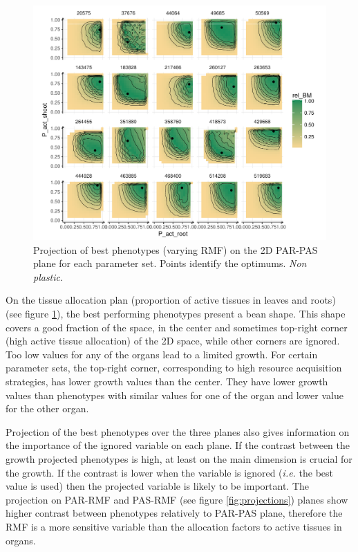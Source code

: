 \begin{figure}\label{fig:best_phenotypes}
\includegraphics[width = \textwidth]{./2_PP/Figures/Landscape/landscape_PAR-PAS.pdf}
\caption{Projection of best phenotypes (varying RMF) on the 2D PAR-PAS plane for each parameter set. Points identify the optimums. \textit{Non plastic}.}
\end{figure}

 On the tissue allocation plan (proportion of active tissues in leaves and roots) (see figure \ref{fig:best_phenotypes}), the best performing phenotypes present a bean shape. This shape covers a good fraction of the space, in the center and sometimes top-right corner (high active tissue allocation) of the 2D space, while other corners are ignored. Too low values for any of the organs lead to a limited growth. For certain parameter sets, the top-right corner, corresponding to high resource acquisition strategies, has lower growth values than the center. They have lower growth values than phenotypes with similar values for one of the organ and lower value for the other organ.  %
 

Projection of the best phenotypes over the three planes also gives information on the importance of the ignored variable on each plane. If the contrast between the growth projected phenotypes is high, at least on the main dimension is crucial for the growth. If the contrast is lower when the variable is ignored (\textit{i.e.} the best value is used) then the projected variable is likely to be important. The projection on PAR-RMF and PAS-RMF (see figure \ref{fig:projections}) planes show higher contrast between phenotypes relatively to PAR-PAS plane, therefore the RMF is a more sensitive variable than the allocation factors to active tissues in organs.


